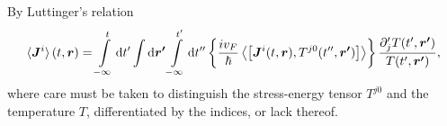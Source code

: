 By Luttinger's relation
\begin{equation}\label{eq:current-luttinger-final}
  \braket{\bm{J}^i}(t, \bm{r}) =
  \int\limits_{-\infty}^t \mathrm{d}t'
  \int \mathrm{d} \bm{r'}
  \int\limits_{-\infty }^{t'} \mathrm{d}t''
  \left\{
    \frac{i v_{F}}{\hbar} \Braket{\left[
        \bm{J}^i(t, \bm{r}), T^{j0}(t'', \bm{r'})
      \right]}
  \right\} 
  \frac{
    \partial'_j T (t', \bm{r'})}{
    T(t', \bm{r'})
  },
\end{equation}
where care must be taken to distinguish the stress-energy tensor $T^{j0}$ and the temperature $T$, differentiated by the indices, or lack thereof.



